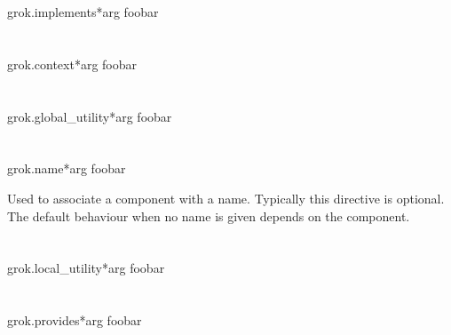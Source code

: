         \begin{funcdesc}{grok.implements}{*arg}
        foobar
        \end{funcdesc}

    \section{}

        \begin{funcdesc}{grok.context}{*arg}
        foobar
        \end{funcdesc}

    \section{}

        \begin{funcdesc}{grok.global_utility}{*arg}
        foobar
        \end{funcdesc}

    \section{}

        \begin{funcdesc}{grok.name}{*arg}
        foobar
        \end{funcdesc}

        Used to associate a component with a name. Typically this directive is
        optional. The default behaviour when no name is given depends on the
        component.

    \section{}

        \begin{funcdesc}{grok.local_utility}{*arg}
        foobar
        \end{funcdesc}

    \section{}

        \begin{funcdesc}{grok.provides}{*arg}
        foobar
        \end{funcdesc}

